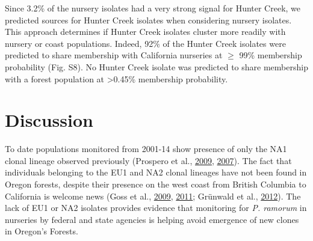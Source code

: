 \documentclass[double,12pt]{beavtex}
\begin{document}
  Since 3.2\% of the nursery isolates had a very strong signal for Hunter
  Creek, we predicted sources for Hunter Creek isolates when considering
  nursery isolates. This approach determines if Hunter Creek isolates
  cluster more readily with nursery or coast populations. Indeed, 92\% of
  the Hunter Creek isolates were predicted to share membership with
  California nurseries at \(\geq\) 99\% membership probability (Fig. S8).
  No Hunter Creek isolate was predicted to share membership with a forest
  population at \textgreater{}0.45\% membership probability.
  
  \section{Discussion}\label{discussion-1}
  
  To date populations monitored from 2001-14 show presence of only the NA1
  clonal lineage observed previously (Prospero et al.,
  \protect\hyperlink{ref-prospero2009migration}{2009},
  \protect\hyperlink{ref-prospero2007population}{2007}). The fact that
  individuals belonging to the EU1 and NA2 clonal lineages have not been
  found in Oregon forests, despite their presence on the west coast from
  British Columbia to California is welcome news (Goss et al.,
  \protect\hyperlink{ref-goss2009population}{2009},
  \protect\hyperlink{ref-goss2011phytophthora}{2011}; Grünwald et al.,
  \protect\hyperlink{ref-grunwald2012emergence}{2012}). The lack of EU1 or
  NA2 isolates provides evidence that monitoring for \emph{P. ramorum} in
  nurseries by federal and state agencies is helping avoid emergence of
  new clones in Oregon's Forests.
  
\end{document}
